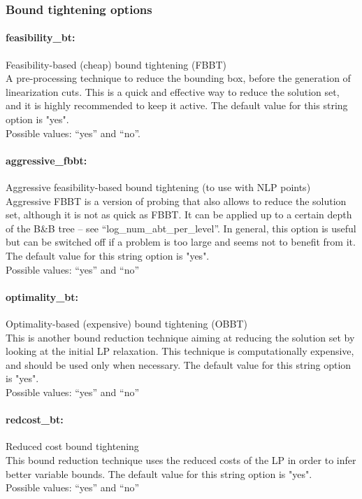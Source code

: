 \subsubsection{Bound tightening options}

\paragraph{feasibility\_bt:}\label{sec:feasibility_bt} Feasibility-based (cheap) bound tightening (FBBT) $\;$ \\
A pre-processing technique to reduce the bounding box, before the generation of linearization cuts.
This is a quick and effective way to reduce the solution set, and it is highly recommended to keep it active.
The default value for this string option is "yes".
\\ 
Possible values: ``yes'' and ``no''.

\paragraph{aggressive\_fbbt:}\label{sec:aggressive_fbbt} Aggressive feasibility-based bound tightening (to use with NLP points) $\;$ \\
Aggressive FBBT is a version of probing that also allows to reduce the solution set, although it is not as quick
as FBBT. It can be applied up to a certain depth of the B\&B tree -- see ``log\_num\_abt\_per\_level''. In general, this option is useful but can be switched off if a problem is too large and seems not to benefit from it.
The default value for this string option is "yes".
\\ 
Possible values: ``yes'' and ``no''

\paragraph{optimality\_bt:}\label{sec:optimality_bt} Optimality-based (expensive) bound tightening (OBBT) $\;$ \\
This is another bound reduction technique aiming at reducing the solution set by looking at the initial LP relaxation.
This technique is computationally expensive, and should be used only when necessary.
The default value for this string option is "yes".\\
Possible values: ``yes'' and ``no''

\paragraph{redcost\_bt:}\label{sec:redcost_bt} Reduced cost bound tightening $\;$ \\
This bound reduction technique uses the reduced costs of the LP in order to infer better variable bounds.
The default value for this string option is "yes".\\ 
Possible values: ``yes'' and ``no''

